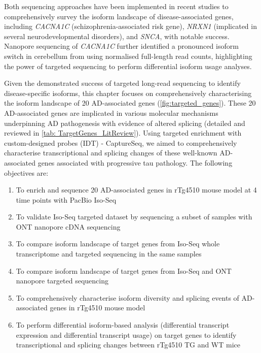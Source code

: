 Both sequencing approaches have been implemented in recent studies\cite{Clark2019,Treutlein2014,Tseng2019} to comprehensively survey the isoform landscape of disease-associated genes, including \textit{CACNA1C} (schizophrenia-associated risk gene)\cite{Clark2019}, \textit{NRXN1} (implicated in several neurodevelopmental disorders)\cite{Treutlein2014}, and \textit{SNCA}\cite{Tseng2019}, with notable success. Nanopore sequencing of \textit{CACNA1C} further identified a pronounced isoform switch in cerebellum from using normalised full-length read counts\cite{Clark2019}, highlighting the power of targeted sequencing to perform differential isoform usage analyses. 

Given the demonstrated success of targeted long-read sequencing to identify disease-specific isoforms, this chapter focuses on comprehensively characterising the isoform landscape of 20 AD-associated genes (\cref{fig:targeted_genes}). These 20 AD-associated genes are implicated in various molecular mechanisms underpinning AD pathogenesis with evidence of altered splicing (detailed and reviewed in \cref{tab: TargetGenes_LitReview}). Using targeted enrichment with custom-designed probes (IDT) - CaptureSeq, we aimed to comprehensively characterise transcriptional and splicing changes of these well-known AD-associated genes associated with progressive tau pathology. The following objectives are:
\begin{enumerate}
	\item To enrich and sequence 20 AD-associated genes in rTg4510 mouse model at 4 time points with PacBio Iso-Seq
	\item To validate Iso-Seq targeted dataset by sequencing a subset of samples with ONT nanopore cDNA sequencing
	\item To compare isoform landscape of target genes from Iso-Seq whole transcriptome and targeted sequencing in the same samples 
	\item To compare isoform landscape of target genes from Iso-Seq and ONT nanopore targeted sequencing
	\item To comprehensively characterise isoform diversity and splicing events of AD-associated genes in rTg4510 mouse model 
	\item To perform differential isoform-based analysis (differential transcript expression and differential transcript usage) on target genes to identify transcriptional and splicing changes between rTg4510 TG and WT mice
\end{enumerate} 
 
